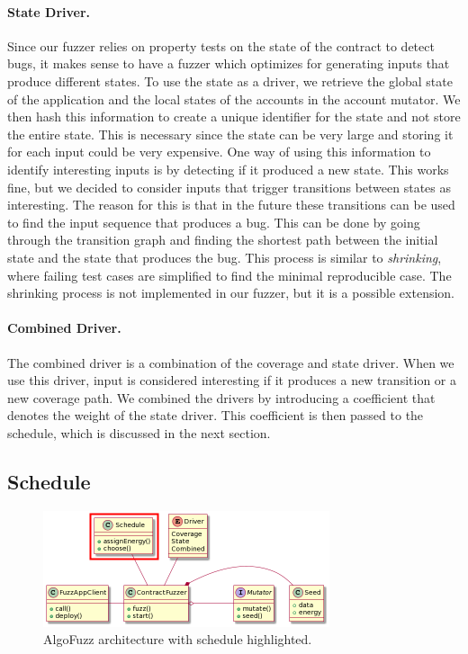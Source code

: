 \paragraph{State Driver.}
Since our fuzzer relies on property tests on the state of the contract to detect bugs, it makes sense to have a fuzzer which optimizes for generating inputs that produce different states.
To use the state as a driver, we retrieve the global state of the application and the local states of the accounts in the account mutator.
We then hash this information to create a unique identifier for the state and not store the entire state.
This is necessary since the state can be very large and storing it for each input could be very expensive.
One way of using this information to identify interesting inputs is by detecting if it produced a new state.
This works fine, but we decided to consider inputs that trigger transitions between states as interesting.
The reason for this is that in the future these transitions can be used to find the input sequence that produces a bug.
This can be done by going through the transition graph and finding the shortest path between the initial state and the state that produces the bug.
This process is similar to \emph{shrinking}, where failing test cases are simplified to find the minimal reproducible case.
The shrinking process is not implemented in our fuzzer, but it is a possible extension.

\paragraph{Combined Driver.}
The combined driver is a combination of the coverage and state driver.
When we use this driver, input is considered interesting if it produces a new transition or a new coverage path.
We combined the drivers by introducing a coefficient that denotes the weight of the state driver.
This coefficient is then passed to the schedule, which is discussed in the next section.

\subsection*{Schedule}

\begin{figure}[!htbp]
    \centering
    \includegraphics[width=0.75\textwidth]{figures/arc-schedule.png}
    \caption{AlgoFuzz architecture with schedule highlighted.}\label{fig:architecture-schedule}
\end{figure}

